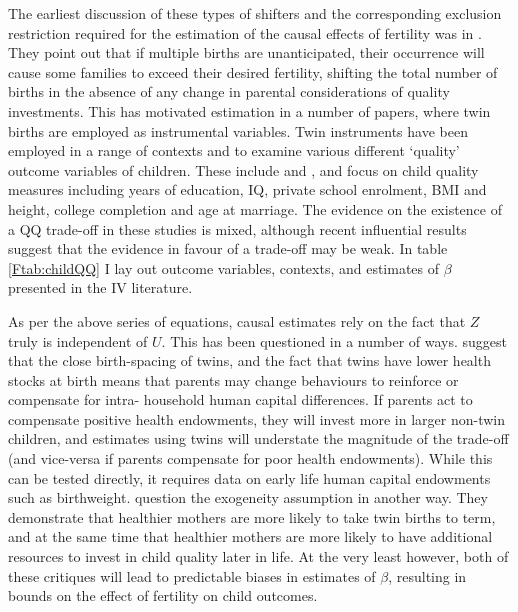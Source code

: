 \documentclass{article}
\begin{document}
\begin{spacing}{1.4}
The earliest discussion of these types of shifters and the corresponding 
exclusion restriction required for the estimation of the causal effects of 
fertility was in \citet{RosenzweigWolpin1980}. They point out that if multiple 
births are unanticipated, their occurrence will cause some families to exceed 
their desired fertility, shifting the total number of births in the absence of 
any change in parental considerations of quality investments. This has motivated 
estimation in a number of papers, where twin births are employed as instrumental 
variables.  Twin instruments have been employed in a range of contexts and
to examine various different `quality' outcome variables of children. These 
include \citet{Blacketal2005,Caceres2006,Lietal2008,Dayiogluetal2009,Sanhueza2009,
Blacketal2010,Angristetal2010,FitzsimonsMalde2010,MarteletodeSouza2012} and 
\citet{SouzaPonczek2012}, 
and focus on child quality measures including years of education, IQ, private 
school enrolment, BMI and height, college completion and age at marriage.  The 
evidence on the existence of a QQ trade-off in these studies is mixed, 
although recent influential results suggest that the evidence in favour of a 
trade-off may be weak.  In table \ref{Ftab:childQQ} I lay out outcome variables, 
contexts, and estimates of $\beta$ presented in the IV literature.

As per the above series of equations, causal estimates rely on the fact that
$Z$ truly is independent of $U$.  This has been questioned in a number of ways.
\citet{RosenzweigZhang2009} suggest that the close birth-spacing of twins, and 
the fact that twins have lower health stocks at birth \citep{Almondetal2005}
means that parents may change behaviours to reinforce or compensate for intra-%
household human capital differences.  If parents act to compensate positive
health endowments, they will invest more in larger non-twin children, and 
estimates using twins will understate the magnitude of the trade-off (and 
vice-versa if parents compensate for poor health endowments).  While this can 
be tested directly, it requires data on early life human capital endowments such 
as birthweight.  \citet{BhalotraClarke2015} question the exogeneity assumption 
in another way. They demonstrate that healthier mothers are more likely to take 
twin births to term, and at the same time that healthier mothers are more likely 
to have additional resources to invest in child quality later in life.  At the 
very least however, both of these critiques will lead to predictable biases in 
estimates of $\beta$, resulting in bounds on the effect of fertility on child
outcomes.


\end{spacing}
\end{document}
